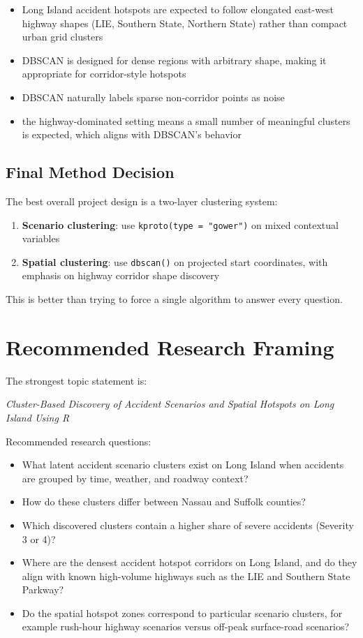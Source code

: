 \documentclass[11pt]{article}
\begin{document}
\begin{itemize}
\item Long Island accident hotspots are expected to follow elongated east-west highway shapes (LIE, Southern State, Northern State) rather than compact urban grid clusters
\item DBSCAN is designed for dense regions with arbitrary shape, making it appropriate for corridor-style hotspots
\item DBSCAN naturally labels sparse non-corridor points as noise
\item the highway-dominated setting means a small number of meaningful clusters is expected, which aligns with DBSCAN's behavior
\end{itemize}

\subsection{Final Method Decision}

The best overall project design is a two-layer clustering system:

\begin{enumerate}
\item \textbf{Scenario clustering}: use \texttt{kproto(type = "gower")} on mixed contextual variables
\item \textbf{Spatial clustering}: use \texttt{dbscan()} on projected start coordinates, with emphasis on highway corridor shape discovery
\end{enumerate}

This is better than trying to force a single algorithm to answer every question.

\section{Recommended Research Framing}

The strongest topic statement is:

\textit{Cluster-Based Discovery of Accident Scenarios and Spatial Hotspots on Long Island Using R}

Recommended research questions:

\begin{itemize}
\item What latent accident scenario clusters exist on Long Island when accidents are grouped by time, weather, and roadway context?
\item How do these clusters differ between Nassau and Suffolk counties?
\item Which discovered clusters contain a higher share of severe accidents (Severity 3 or 4)?
\item Where are the densest accident hotspot corridors on Long Island, and do they align with known high-volume highways such as the LIE and Southern State Parkway?
\item Do the spatial hotspot zones correspond to particular scenario clusters, for example rush-hour highway scenarios versus off-peak surface-road scenarios?
\end{itemize}
\end{document}
